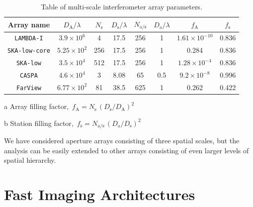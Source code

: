 \documentclass[
  journal=pasa,
  manuscript=article-type,
  year=2020,
  volume=37,
]{cup-journal}
\begin{document}
\begin{table}[htb!]
\normalsize
\begin{threeparttable}
\caption{Table of multi-scale interferometer array parameters.}
\label{tab:array_params}
\begin{tabular}{cccccc|cc}
\toprule
\headrow Array name & $D_\textrm{A}/\lambda$ & $N_\textrm{s}$ & $D_\textrm{s}/\lambda$ & $N_\textrm{a/s}$ & $D_\textrm{a}/\lambda$ & $f_\textrm{A}$\tnote{a} & $f_\textrm{s}$\tnote{b} \\
\midrule
\texttt{LAMBDA-I} & $3.9\times 10^6$ & 4 & 17.5 & 256 & 1 & $1.61\times 10^{-10}$ & 0.836 \\ 
\texttt{SKA-low-core} & $5.25\times 10^{2}$ & 256 & 17.5 & 256 & 1 & 0.284 & 0.836 \\ 
\texttt{SKA-low} & $3.5\times 10^4$ & 512 & 17.5 & 256 & 1 & $1.28\times 10^{-4}$ & 0.836 \\ 
\texttt{CASPA} & $4.6\times 10^4$ & 3 & 8.08 & 65 & 0.5 & $9.2\times 10^{-8}$ & 0.996 \\ 
\texttt{FarView} & $6.77\times 10^2$ & 81 & 38.5 & 625 & 1 & 0.262 & 0.422 \\ 
\bottomrule
\end{tabular}
\begin{tablenotes}[hang]
\item[a]Array filling factor, $\,f_\textrm{A}=N_\textrm{s}\,(D_\textrm{s}/D_\textrm{A})^2$
\item[b]Station filling factor, $\,f_\textrm{s}=N_\textrm{a/s}\,(D_\textrm{a}/D_\textrm{s})^2$
\end{tablenotes}
\end{threeparttable}
\end{table}

We have considered aperture arrays consisting of three spatial scales, but the analysis can be easily extended to other arrays consisting of even larger levels of spatial hierarchy. 

\section{Fast Imaging Architectures} \label{sec:img-archs}
\end{document}
